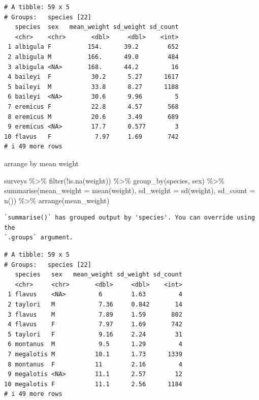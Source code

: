 \documentclass[
  letterpaper,
  DIV=11,
  numbers=noendperiod]{scrreprt}
\newenvironment{Shaded}{\begin{snugshade}}{\end{snugshade}}
\newcommand{\AttributeTok}[1]{\textcolor[rgb]{0.40,0.45,0.13}{#1}}
\newcommand{\FunctionTok}[1]{\textcolor[rgb]{0.28,0.35,0.67}{#1}}
\newcommand{\NormalTok}[1]{\textcolor[rgb]{0.00,0.23,0.31}{#1}}
\newcommand{\SpecialCharTok}[1]{\textcolor[rgb]{0.37,0.37,0.37}{#1}}
\begin{document}
\begin{verbatim}
# A tibble: 59 x 5
# Groups:   species [22]
   species  sex   mean_weight sd_weight sd_count
   <chr>    <chr>       <dbl>     <dbl>    <int>
 1 albigula F          154.      39.2        652
 2 albigula M          166.      49.0        484
 3 albigula <NA>       168.      44.2         16
 4 baileyi  F           30.2      5.27      1617
 5 baileyi  M           33.8      8.27      1188
 6 baileyi  <NA>        30.6      9.96         5
 7 eremicus F           22.8      4.57       568
 8 eremicus M           20.6      3.49       689
 9 eremicus <NA>        17.7      0.577        3
10 flavus   F            7.97     1.69       742
# i 49 more rows
\end{verbatim}

arrange by mean weight

\begin{Shaded}
\begin{Highlighting}[]
\NormalTok{surveys }\SpecialCharTok{\%\textgreater{}\%}
  \FunctionTok{filter}\NormalTok{(}\SpecialCharTok{!}\FunctionTok{is.na}\NormalTok{(weight)) }\SpecialCharTok{\%\textgreater{}\%}
  \FunctionTok{group\_by}\NormalTok{(species, sex) }\SpecialCharTok{\%\textgreater{}\%}
  \FunctionTok{summarise}\NormalTok{(}\AttributeTok{mean\_weight =} \FunctionTok{mean}\NormalTok{(weight), }\AttributeTok{sd\_weight =} \FunctionTok{sd}\NormalTok{(weight), }\AttributeTok{sd\_count =} \FunctionTok{n}\NormalTok{()) }\SpecialCharTok{\%\textgreater{}\%}
  \FunctionTok{arrange}\NormalTok{(mean\_weight)}
\end{Highlighting}
\end{Shaded}

\begin{verbatim}
`summarise()` has grouped output by 'species'. You can override using the
`.groups` argument.
\end{verbatim}

\begin{verbatim}
# A tibble: 59 x 5
# Groups:   species [22]
   species   sex   mean_weight sd_weight sd_count
   <chr>     <chr>       <dbl>     <dbl>    <int>
 1 flavus    <NA>         6        1.63         4
 2 taylori   M            7.36     0.842       14
 3 flavus    M            7.89     1.59       802
 4 flavus    F            7.97     1.69       742
 5 taylori   F            9.16     2.24        31
 6 montanus  M            9.5      1.29         4
 7 megalotis M           10.1      1.73      1339
 8 montanus  F           11        2.16         4
 9 megalotis <NA>        11.1      2.57        12
10 megalotis F           11.1      2.56      1184
# i 49 more rows
\end{verbatim}
\end{document}
